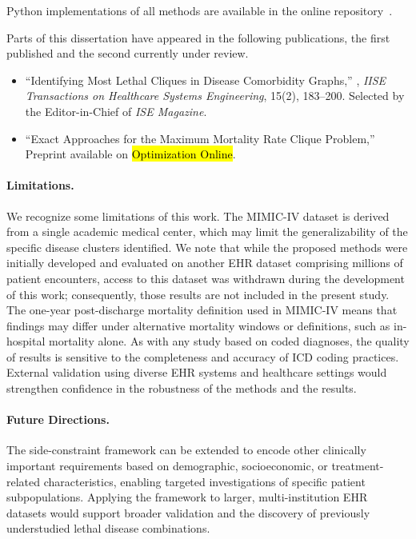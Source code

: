 Python implementations of all methods are available in the online repository~\citep{Diss-GithubRepo}.

Parts of this dissertation have appeared in the following publications,
the first published and the second currently under review.
\begin{itemize}
    \item ``Identifying Most Lethal Cliques in Disease Comorbidity
    Graphs,'' \cite{VaghfiMohebbi2025lethalclique}, \textit{IISE
    Transactions on Healthcare Systems Engineering}, 15(2), 183--200.
    Selected by the Editor-in-Chief of \textit{ISE Magazine}.
    \item ``Exact Approaches for the Maximum Mortality Rate Clique
    Problem,'' Preprint available on \hl{Optimization Online}.
\end{itemize}

\paragraph{Limitations.}
We recognize some limitations of this work. The MIMIC-IV dataset is
derived from a single academic medical center, which may limit the
generalizability of the specific disease clusters identified. We note
that while the proposed methods were initially developed and evaluated
on another EHR dataset comprising millions of patient encounters,
access to this dataset was withdrawn during the development of this
work; consequently, those results are not included in the present
study. The one-year post-discharge mortality definition used in
MIMIC-IV means that findings may differ under alternative mortality
windows or definitions, such as in-hospital mortality alone. As with
any study based on coded diagnoses, the quality of results is
sensitive to the completeness and accuracy of ICD coding practices.
External validation using diverse EHR systems and healthcare settings
would strengthen confidence in the robustness of the methods and the
results.

\paragraph{Future Directions.}
The side-constraint framework can be extended to encode other clinically
important requirements based on demographic, socioeconomic, or
treatment-related characteristics, enabling targeted investigations
of specific patient subpopulations. Applying the framework to larger,
multi-institution EHR datasets would support broader validation and
the discovery of previously understudied lethal disease combinations.

